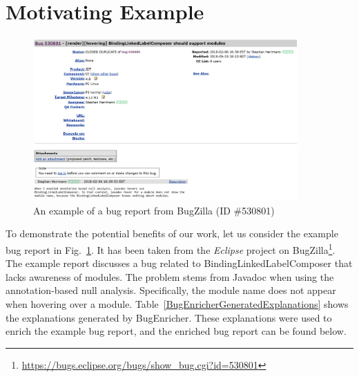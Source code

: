\section{Motivating Example} \label{Chap2:Motivation}
\begin{figure}[!htpb]
  \centering
  \includegraphics[width=0.9\textwidth]{images/motivatingexampleBE.png}
  \caption{An example of a bug report from BugZilla (ID \#530801)}
  \label{Chap2_fig:motivating_example}
\end{figure}

\begin{table}[!ht]
\centering
\caption{Generated Explanations by BugEnricher}
\label{BugEnricherGeneratedExplanations}
\end{table}

To demonstrate the potential benefits of our work, let us consider the example bug report in Fig.~\ref{Chap2_fig:motivating_example}. It has been taken from the \emph{Eclipse} project on BugZilla\footnote{\url{https://bugs.eclipse.org/bugs/show_bug.cgi?id=530801}\label{chap2_motivating_example}}. The example report discusses a bug related to BindingLinkedLabelComposer that lacks awareness of modules. The problem stems from Javadoc when using the annotation-based null analysis. Specifically, the module name does not appear when hovering over a module. Table~\ref{BugEnricherGeneratedExplanations} shows the explanations generated by BugEnricher. These explanations were used to enrich the example bug report, and the enriched bug report can be found below.\par

